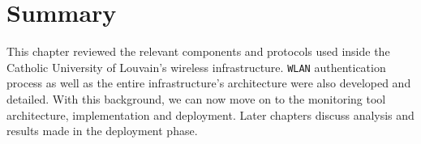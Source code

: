 \section{Summary}
This chapter reviewed the relevant components and protocols used inside the Catholic University of Louvain's wireless infrastructure. \texttt{WLAN} authentication process as well as the entire infrastructure's architecture were also developed and detailed. With this background, we can now move on to the monitoring tool architecture, implementation and deployment. Later chapters discuss analysis and results made in the deployment phase.





